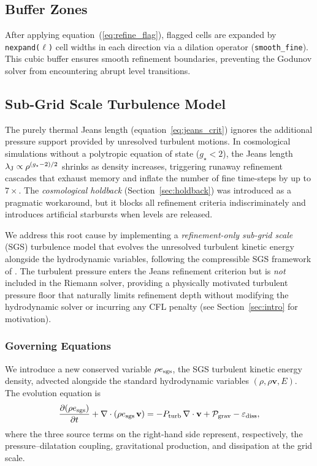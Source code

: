 \documentclass[fleqn,usenatbib]{mnras}
\newcommand{\lJ}{\lambda_{\rm J}}
\newcommand{\gstar}{g_\star}
\newcommand{\code}[1]{\texttt{#1}}
\begin{document}
\subsection{Buffer Zones}

After applying equation~(\ref{eq:refine_flag}), flagged cells are
expanded by \code{nexpand($\ell$)} cell widths in each direction via a
dilation operator (\code{smooth\_fine}).
This cubic buffer ensures smooth refinement boundaries, preventing
the Godunov solver from encountering abrupt level transitions.


\subsection{Sub-Grid Scale Turbulence Model}
\label{sec:sgs}

The purely thermal Jeans length
(equation~\ref{eq:jeans_crit}) ignores the additional pressure
support provided by unresolved turbulent motions.  In cosmological
simulations without a polytropic equation of state ($\gstar < 2$),
the Jeans length $\lJ \propto \rho^{(\gstar - 2)/2}$ shrinks as
density increases, triggering runaway refinement cascades that
exhaust memory and inflate the number of fine time-steps by up to
$7\times$.  The \emph{cosmological holdback}
(Section~\ref{sec:holdback}) was introduced as a pragmatic
workaround, but it blocks all refinement criteria indiscriminately and
introduces artificial starbursts when levels are released.

We address this root cause by implementing a \emph{refinement-only
sub-grid scale} (SGS) turbulence model that evolves the unresolved
turbulent kinetic energy alongside the hydrodynamic variables,
following the compressible SGS framework of
\citet{Schmidt2006,Schmidt2011,Scannapieco2008}.  The turbulent
pressure enters the Jeans refinement criterion but is \emph{not}
included in the Riemann solver, providing a physically motivated
turbulent pressure floor that naturally limits refinement depth
without modifying the hydrodynamic solver or incurring any CFL
penalty (see Section~\ref{sec:intro} for motivation).


\subsubsection{Governing Equations}
\label{sec:sgs_eqs}

We introduce a new conserved variable $\rho e_{\rm sgs}$, the SGS
turbulent kinetic energy density, advected alongside the standard
hydrodynamic variables $(\rho, \rho\mathbf{v}, E)$.  The evolution
equation is
\begin{equation}
  \frac{\partial (\rho e_{\rm sgs})}{\partial t}
  + \nabla\cdot(\rho e_{\rm sgs}\,\mathbf{v})
  = -P_{\rm turb}\,\nabla\cdot\mathbf{v}
    + \mathcal{P}_{\rm grav}
    - \varepsilon_{\rm diss},
  \label{eq:sgs_evolution}
\end{equation}
where the three source terms on the right-hand side represent,
respectively, the pressure--dilatation coupling, gravitational
production, and dissipation at the grid scale.
\end{document}
